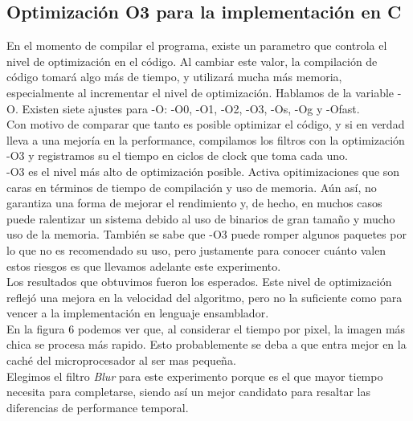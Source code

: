 \documentclass[10pt,a4paper,spanish]{article}
\begin{document}
\subsection{Optimización O3 para la implementación en C}

En el momento de compilar el programa, existe un parametro que controla el nivel de optimización en el código. Al cambiar este valor, la compilación de código tomará algo más de tiempo, y utilizará mucha más memoria, especialmente al incrementar el nivel de optimización. Hablamos de la variable -O. Existen siete ajustes para -O: -O0, -O1, -O2, -O3, -Os, -Og y -Ofast. \\

Con motivo de comparar que tanto es posible optimizar el código, y si en verdad lleva a una mejoría en la performance, compilamos los filtros con la optimización -O3 y registramos su el tiempo en ciclos de clock que toma cada uno. \\

-O3 es el nivel más alto de optimización posible. Activa opitimizaciones que son caras en términos de tiempo de compilación y uso de memoria. Aún así, no garantiza una forma de mejorar el rendimiento y, de hecho, en muchos casos puede ralentizar un sistema debido al uso de binarios de gran tamaño y mucho uso de la memoria. También se sabe que -O3 puede romper algunos paquetes por lo que no es recomendado su uso, pero justamente para conocer cuánto valen estos riesgos es que llevamos adelante este experimento. \\

Los resultados que obtuvimos fueron los esperados. Este nivel de optimización reflejó una mejora en la velocidad del algoritmo, pero no la suficiente como para vencer a la implementación en lenguaje ensamblador. \\

En la figura 6 podemos ver que, al considerar el tiempo por pixel, la imagen más chica se procesa más rapido. Esto probablemente se deba a que entra mejor en la caché del microprocesador al ser mas pequeña. \\

Elegimos el filtro \textit{Blur} para este experimento porque es el que mayor tiempo necesita para completarse, siendo así un mejor candidato para resaltar las diferencias de performance temporal. \\
\end{document}
